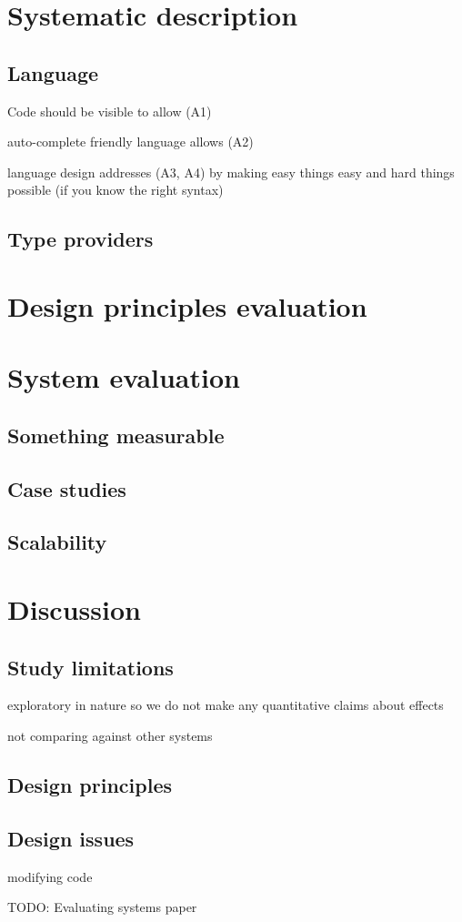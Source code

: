 \documentclass{sigchi}
\begin{document}
\section{Systematic description}

\subsection{Language}

Code should be visible to allow (A1)

auto-complete friendly language allows (A2)

language design addresses (A3, A4) by making easy things easy and hard
things possible (if you know the right syntax)

\subsection{Type providers}

\section{Design principles evaluation}

\section{System evaluation}

\subsection{Something measurable}

\subsection{Case studies}

\subsection{Scalability}

\section{Discussion}

\subsection{Study limitations}
exploratory in nature so we do not make any quantitative claims about effects

not comparing against other systems

\subsection{Design principles}

\subsection{Design issues}
modifying code

\newpage
TODO: Evaluating systems paper

\balance{}


\end{document}
